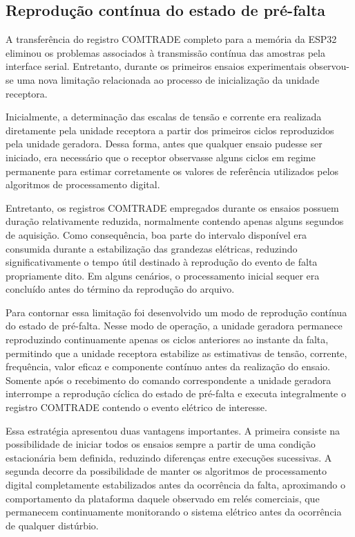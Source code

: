 \subsection{Reprodução contínua do estado de pré-falta}

A transferência do registro COMTRADE completo para a memória da ESP32 eliminou os problemas associados à transmissão contínua das amostras pela interface serial. Entretanto, durante os primeiros ensaios experimentais observou-se uma nova limitação relacionada ao processo de inicialização da unidade receptora.

Inicialmente, a determinação das escalas de tensão e corrente era realizada diretamente pela unidade receptora a partir dos primeiros ciclos reproduzidos pela unidade geradora. Dessa forma, antes que qualquer ensaio pudesse ser iniciado, era necessário que o receptor observasse alguns ciclos em regime permanente para estimar corretamente os valores de referência utilizados pelos algoritmos de processamento digital.

Entretanto, os registros COMTRADE empregados durante os ensaios possuem duração relativamente reduzida, normalmente contendo apenas alguns segundos de aquisição. Como consequência, boa parte do intervalo disponível era consumida durante a estabilização das grandezas elétricas, reduzindo significativamente o tempo útil destinado à reprodução do evento de falta propriamente dito. Em alguns cenários, o processamento inicial sequer era concluído antes do término da reprodução do arquivo.

Para contornar essa limitação foi desenvolvido um modo de reprodução contínua do estado de pré-falta. Nesse modo de operação, a unidade geradora permanece reproduzindo continuamente apenas os ciclos anteriores ao instante da falta, permitindo que a unidade receptora estabilize as estimativas de tensão, corrente, frequência, valor eficaz e componente contínuo antes da realização do ensaio. Somente após o recebimento do comando correspondente a unidade geradora interrompe a reprodução cíclica do estado de pré-falta e executa integralmente o registro COMTRADE contendo o evento elétrico de interesse.

Essa estratégia apresentou duas vantagens importantes. A primeira consiste na possibilidade de iniciar todos os ensaios sempre a partir de uma condição estacionária bem definida, reduzindo diferenças entre execuções sucessivas. A segunda decorre da possibilidade de manter os algoritmos de processamento digital completamente estabilizados antes da ocorrência da falta, aproximando o comportamento da plataforma daquele observado em relés comerciais, que permanecem continuamente monitorando o sistema elétrico antes da ocorrência de qualquer distúrbio.

